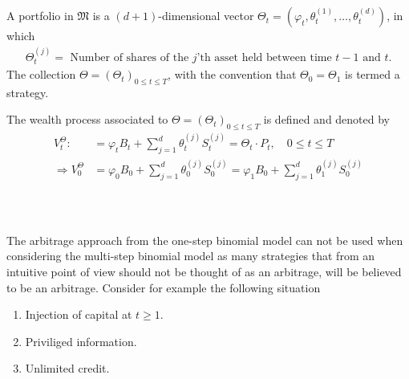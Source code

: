 \documentclass{beamer}
\numberwithin{equation}{section}
\begin{document}
\begin{frame}\frametitle{{\normalsize \secname} \\ {\large \subsecname}}
    \begin{definition}
        \begingroup
        \footnotesize
        A portfolio in $\mathfrak{M}$ is a $(d + 1)$-dimensional vector $\Theta_t = \left(\varphi_t, \theta_t^{(1)}, \ldots, \theta_t^{(d)}\right)$, in which
        \begin{align}
            \Theta_t^{(j)} = \text{ Number of shares of the $j$'th asset held between time $t - 1$ and $t$.}
        \end{align}
        The collection $\Theta = \left(\Theta_t\right)_{0 \leq t \leq T}$, with the convention that $\Theta_0 = \Theta_1$ is termed a strategy.

        The wealth process associated to $\Theta = \left(\Theta_t\right)_{0\leq t \leq T}$ is defined and denoted by
        \begin{align}
            V_t^\Theta :&= \varphi_tB_t + \sum_{j = 1}^d\theta_t^{(j)}S_t^{(j)} = \Theta_t \cdot P_t, \quad 0 \leq t \leq T \\
            \Rightarrow V_0^\Theta &= \varphi_0B_0 + \sum_{j = 1}^d\theta_0^{(j)}S_0^{(j)} = \varphi_1B_0 + \sum_{j = 1}^d\theta_1^{(j)}S_0^{(j)}
        \end{align}
        \endgroup
    \end{definition}
\end{frame}

\begin{frame}\frametitle{{\normalsize \secname} \\ {\large \subsecname}}
    The arbitrage approach from the one-step binomial model can not be used when considering the multi-step binomial model as many strategies that from an intuitive point of view should not be thought of as an arbitrage, will be believed to be an arbitrage.
    Consider for example the following situation
    \begin{enumerate}
        \item Injection of capital at $t \geq 1$.
        \item Priviliged information.
        \item Unlimited credit.
    \end{enumerate}
\end{frame}
\end{document}
